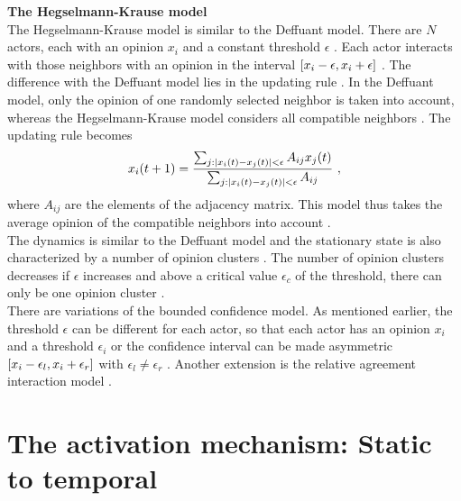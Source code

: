 \documentclass[11 pt , letterpaper , twoside , openright]{book}
\begin{document}
\newline
\textbf{The Hegselmann-Krause model}\\
\newline
The Hegselmann-Krause model is similar to the Deffuant model. There are $N$ actors, each with an opinion $x_i$ and a constant threshold $\epsilon$ \cite{Castellano2009}. Each actor interacts with those neighbors with an opinion in the interval $\interval{x_i-\epsilon}{x_i+\epsilon}$ \cite{Castellano2009}. The difference with the Deffuant model lies in the updating rule \cite{Castellano2009}. In the Deffuant model, only the opinion of one randomly selected neighbor is taken into account, whereas the Hegselmann-Krause model considers all compatible neighbors \cite{Castellano2009}. The updating rule becomes \cite{Castellano2009}
\begin{equation}
	x_i(t+1) = \frac{\sum_{j:\abs{x_i(t) - x_j(t)}<\epsilon}A_{ij}x_j(t)}{\sum_{j:\abs{x_i(t) - x_j(t)}<\epsilon}A_{ij}} \ ,
\end{equation}
where $A_{ij}$ are the elements of the adjacency matrix. This model thus takes the average opinion of the compatible neighbors into account \cite{Castellano2009}.\\
\newline
The dynamics is similar to the Deffuant model and the stationary state is also characterized by a number of opinion clusters \cite{Castellano2009}. The number of opinion clusters decreases if $\epsilon$ increases and above a critical value $\epsilon_c$ of the threshold, there can only be one opinion cluster \cite{Castellano2009}.\\
\newline
There are variations of the bounded confidence model. As mentioned earlier, the threshold $\epsilon$ can be different for each actor, so that each actor has an opinion $x_i$ and a threshold $\epsilon_i$ or the confidence interval can be made asymmetric $\interval{x_i - \epsilon_l}{x_i + \epsilon_r}$ with $\epsilon_l \neq
\epsilon_r$ \cite{Krause2002}. Another extension is the relative agreement interaction model \cite{Deffuant2006}\cite{Deffuant2002}.

\section{The activation mechanism: Static to temporal}\label{actMech}
\end{document}

